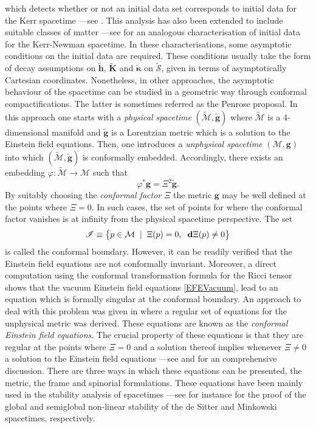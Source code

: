 \documentclass[10pt,a4paper]{article}
\theoremstyle{plain}
\def\bmg{{\bm g}}
\def\bmh{{\bm h}}
\def\bmK{{\bm K}}
\begin{document}
 which detects whether or not an initial data set corresponds to
 initial data for the Kerr spacetime ---see
 \cite{BaeVal10a,BaeVal10b,BaeVal11b}.
This analysis has also been extended to include suitable classes of
matter ---see \cite{ValCol16} for an analogous characterisation of
initial data for the Kerr-Newman spacetime.  In these
characterisations, some asymptotic conditions on the initial data are
required. These conditions  usually take the form of decay assumptions
on   $\tilde{\bmh}$, $\tilde{\bmK}$ and $\tilde{\bm\kappa}$ on
$\tilde{\mathcal{S}}$, given in terms
of asymptotically Cartesian coordinates.  Nonetheless, in other
approaches, the asymptotic behaviour of the spacetime can be studied in
a geometric way through conformal compactifications. The latter is
sometimes referred as the Penrose proposal. In this approach one
starts with a \emph{physical spacetime}
$(\tilde{\mathcal{M}},\tilde{\bmg})$ where $\tilde{\mathcal{M}}$ is a
4-dimensional manifold and $\tilde{\bmg}$ is a Lorentzian metric which
is a solution to the Einstein field equations.  Then, one introduces a
\emph{unphysical spacetime} $(\mathcal{M},\bmg)$ into which
$(\tilde{\mathcal{M}},\tilde{\bmg})$ is conformally embedded.
Accordingly, there exists an embedding $\varphi: \tilde{\mathcal{M}}
\rightarrow \mathcal{M}$ such that
\begin{equation} \label{eqn:Chapter:Introduction:ConformalRescaling}
\varphi^{*}\bmg=\Xi^2\tilde{\bmg}.
\end{equation}
 By suitably choosing the \emph{conformal factor} $\Xi$ the metric
 $\bmg$ may be well defined at the points where $\Xi=0$. In such
 cases, the set of points for where the conformal factor vanishes is
 at infinity from the physical spacetime perspective.
\noindent The set
\[
 \mathscr{I} \equiv \big\{p \in \mathcal{M} \hspace{0.2cm}| \hspace{0.2cm} \Xi(p)=0
 , \hspace{0.2cm} \mathbf{d}\Xi(p) \neq0\big\}
\]
is called the conformal boundary.  However, it can be readily
verified that the Einstein field equations are not conformally
invariant. Moreover, a direct computation using the conformal
transformation formula for the Ricci tensor shows that the vacuum
Einstein field equations \eqref{EFEVacuum}, lead to an equation which
is formally singular at the conformal boundary.  An approach to deal
with this problem was given in \cite{Fri81a} where a regular set of
equations for the unphysical metric was derived. These equations are
known as the \emph{conformal Einstein field equations}.  The crucial
property of these equations is that they are regular at the points
where $\Xi=0$ and a solution thereof implies whenever $\Xi\neq 0$ a
solution to the Einstein field equations ---see \cite{Fri81a,Fri83}
and \cite{CFEbook} for an comprehensive discussion.  There are three
ways in which these equations can be presented, the metric, the frame
and spinorial formulations. These equations have been mainly used in
the stability analysis of spacetimes ---see for instance \cite{Fri86b,
  Fri86c} for the proof of the global and semiglobal non-linear
stability of the de Sitter and Minkowski spacetimes, respectively.
\end{document}
